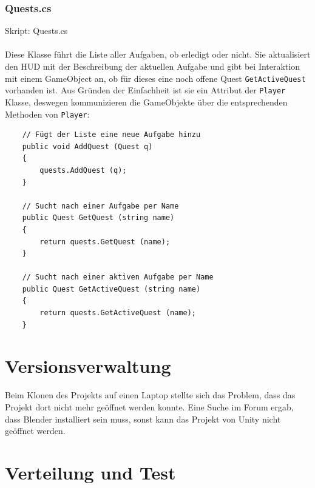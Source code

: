 \subsubsection{Quests.cs}
Skript: Quests.cs\\\\
Diese Klasse führt die Liste aller Aufgaben, ob erledigt oder nicht. Sie  aktualisiert den HUD mit der Beschreibung der aktuellen Aufgabe und gibt bei Interaktion mit einem GameObject an, ob für dieses eine noch offene Quest \lstinline{GetActiveQuest} vorhanden ist. Aus Gründen der Einfachheit ist sie ein Attribut der \lstinline{Player} Klasse, deswegen kommunizieren die GameObjekte über die entsprechenden Methoden von \lstinline{Player}:

\begin{lstlisting}
	// Fügt der Liste eine neue Aufgabe hinzu
	public void AddQuest (Quest q)
	{
		quests.AddQuest (q);
	}

	// Sucht nach einer Aufgabe per Name
	public Quest GetQuest (string name)
	{
		return quests.GetQuest (name);
	}

	// Sucht nach einer aktiven Aufgabe per Name
	public Quest GetActiveQuest (string name)
	{
		return quests.GetActiveQuest (name);
	}
\end{lstlisting}








\section{Versionsverwaltung}

Beim Klonen des Projekts auf einen Laptop stellte sich das Problem, dass das Projekt dort nicht mehr geöffnet werden konnte. Eine Suche im Forum ergab, dass Blender installiert sein muss, sonst kann das Projekt von Unity nicht geöffnet werden.

\section{Verteilung und Test}


